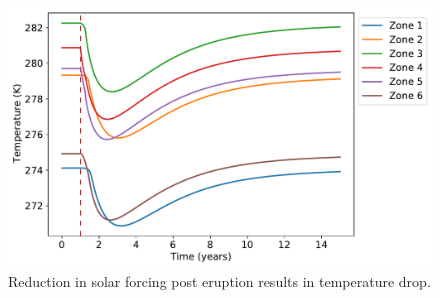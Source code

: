 \documentclass[12pt]{article}
\begin{document}
\begin{figure}[H]
    \centering
    \includegraphics[scale=0.6]{one_eruption.pdf}
    \caption{
        Reduction in solar forcing post eruption results in temperature drop.
    }
    \label{fig:oneerupt}
\end{figure}
\FloatBarrier
\end{document}
